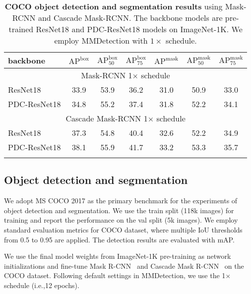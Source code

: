 \documentclass[runningheads]{llncs}
\newcommand{\tablestyle}[2]{\setlength{\tabcolsep}{#1}\renewcommand{\arraystretch}{#2}\centering\footnotesize}
\newcommand{\gr}{\rowcolor[gray]{.95}}
\providecommand\ie{i.e.,}
\begin{document}
\begin{table}[ht!]
\caption[caption]{\textbf{COCO object detection and segmentation results} using Mask-RCNN and Cascade Mask-RCNN. The backbone models are pre-trained ResNet18 and PDC-ResNet18 models on ImageNet-1K. We employ MMDetection with $1\times$ schedule.
\label{tab:grigorisrebuttal2}
}
\tablestyle{6pt}{1.1}
\addtolength{\tabcolsep}{-4.5pt}
\vspace{2ex}
\begin{tabular}{@{}lcccccc@{}}
\hline
backbone & $\text{AP}^{\text{box}}$ & $\text{AP}^{\text{box}}_{50}$ & $\text{AP}^{\text{box}}_{75}$ & $\text{AP}^{\text{mask}}$ & $\text{AP}^{\text{mask}}_{\text{50}}$ & $\text{AP}^{\text{mask}}_{75}$  \\
\hline
\multicolumn{7}{c}{{Mask-RCNN 1$\times$ schedule}} \\
ResNet18      & 33.9 & 53.9 &36.2 &31.0 & 50.9 & 33.0 \\
\gr
PDC-ResNet18  & 34.8 & 55.2 & 37.4 & 31.8 & 52.2 & 34.1 \\
\hline
\multicolumn{7}{c}{{Cascade Mask-RCNN 1$\times$ schedule}} \\
ResNet18        & 37.3 &54.8 &40.4 &32.6 &52.2 &34.9 \\
\gr
PDC-ResNet18    & 38.1 & 55.9 & 41.7 & 33.2 & 53.3 & 35.7 \\
\hline
\\
\end{tabular}

\end{table}

\subsection{Object detection and segmentation}

We adopt MS COCO 2017 \cite{Lin2014} as the primary benchmark for the experiments of object detection and segmentation. We use the train split (118k images) for training and report the performance on the val split (5k images). We employ standard evaluation metrics for COCO dataset, where multiple IoU thresholds from 0.5 to 0.95 are applied. The detection results are evaluated with mAP.

We use the final model weights
from ImageNet-1K pre-training as network initializations and fine-tune Mask R-CNN~\cite{He2017} and Cascade Mask R-CNN~\cite{Cai2018} on the COCO dataset. Following default settings in MMDetection, we use the 1$\times$ schedule (\ie 12 epochs). 
\end{document}
